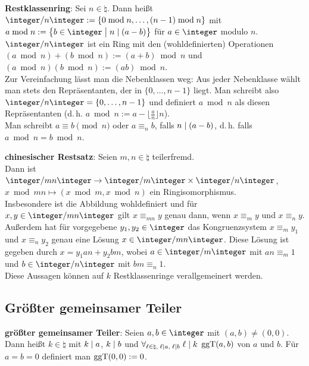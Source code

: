 \textbf{Restklassenring}:
Sei $n \in \natural$.
Dann heißt $\ZnZ := \{0 \bmod n, \dotsc, (n - 1) \bmod n\}$ mit\\
$a \bmod n := \big\{b \in \integer \;\big|\; n \teilt (a - b)\big\}$ für $a \in \integer$
 modulo $n$.\\
$\ZnZ$ ist ein Ring mit den (wohldefinierten) Operationen\\
$(a \bmod n) + (b \bmod n) := (a + b) \bmod n$ und
$(a \bmod n)(b \bmod n) := (ab) \bmod n$.\\
Zur Vereinfachung lässt man die Nebenklassen weg:
Aus jeder Nebenklasse wählt man stets den Repräsentanten, der in $\{0, \dotsc, n - 1\}$ liegt.
Man schreibt also $\ZnZ = \{0, \dotsc, n - 1\}$ und definiert
$a \bmod n$ als diesen Repräsentanten
(d.\,h. $a \bmod n := a - \lfloor\frac{a}{n}\rfloor n$).\\
Man schreibt $a \equiv b \pmod n$ oder $a \equiv_n b$, falls $n \mid (a - b)$,
d.\,h. falls $a \bmod n = b \bmod n$.

\textbf{chinesischer Restsatz}:
Seien $m, n \in \natural$ teilerfremd.\\
Dann ist
$\integer/mn\integer \rightarrow \integer/m\integer \times \integer/n\integer$,
$x \bmod mn \mapsto (x \bmod m, x \bmod n)$
ein Ringisomorphismus.\\
Insbesondere ist die Abbildung wohldefiniert und für $x, y \in \integer/mn\integer$ gilt
$x \equiv_{mn} y$ genau dann, wenn $x \equiv_m y$ und $x \equiv_n y$.\\
Außerdem hat für vorgegebene $y_1, y_2 \in \integer$ das Kongruenzsystem
$x \equiv_m y_1$ und $x \equiv_n y_2$ genau eine Lösung $x \in \integer/mn\integer$.
Diese Lösung ist gegeben durch $x = y_1 a n + y_2 b m$,
wobei $a \in \integer/m\integer$ mit $an \equiv_m 1$ und
$b \in \integer/n\integer$ mit $bm \equiv_n 1$.\\
Diese Aussagen können auf $k$ Restklassenringe verallgemeinert werden.

\subsection{%
    Größter gemeinsamer Teiler%
}

\textbf{größter gemeinsamer Teiler}:
Seien $a, b \in \integer$ mit $(a, b) \not= (0, 0)$.\\
Dann heißt $k \in \natural$ mit $k \mid a$, $k \mid b$ und
$\forall_{\ell \in \natural,\; \ell \mid a,\; \ell \mid b}\; \ell \mid k$
 $\operatorname{ggT}(a, b)$ von $a$ und $b$.
Für $a = b = 0$ definiert man $\operatorname{ggT}(0, 0) := 0$.

